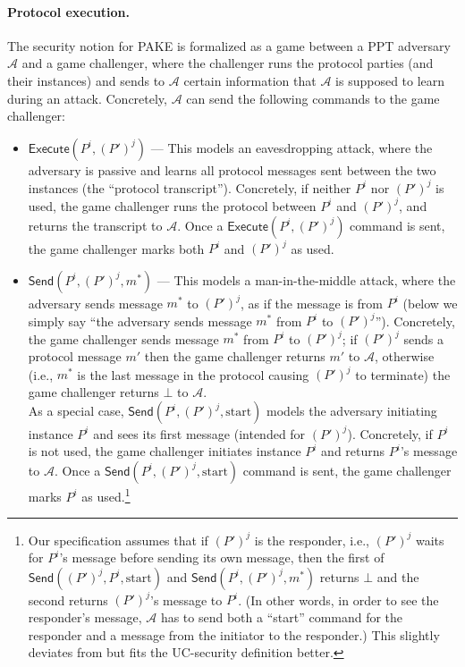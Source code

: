 \documentclass{article}
\newcommand{\adv}{\mathcal{A}}
\newcommand{\Execute}{\mathsf{Execute}}
\newcommand{\Send}{\mathsf{Send}}
\begin{document}
\paragraph{Protocol execution.}
The security notion for PAKE is formalized as a game between a PPT adversary $\adv$ and a game challenger, where the challenger runs the protocol parties (and their instances) and sends to $\adv$ certain information that $\adv$ is supposed to learn during an attack. Concretely, $\adv$ can send the following commands to the game challenger:
\begin{itemize}
  \item $\Execute(P^i, (P')^j)$ --- This models an eavesdropping attack, where the adversary is passive and learns all protocol messages sent between the two instances (the ``protocol transcript''). Concretely, if neither $P^i$ nor $(P')^j$ is used, the game challenger runs the protocol between $P^i$ and $(P')^j$, and returns the transcript to $\adv$. Once a $\Execute(P^i, (P')^j)$ command is sent, the game challenger marks both $P^i$ and $(P')^j$ as used.
  \item $\Send(P^i, (P')^j, m^*)$ --- This models a man-in-the-middle attack, where the adversary sends message $m^*$ to $(P')^j$, as if the message is from $P^i$ (below we simply say ``the adversary sends message $m^*$ from $P^i$ to $(P')^j$''). Concretely, the game challenger sends message $m^*$ from $P^i$ to $(P')^j$; if $(P')^j$ sends a protocol message $m'$ then the game challenger returns $m'$ to $\adv$, otherwise (i.e., $m^*$ is the last message in the protocol causing $(P')^j$ to terminate) the game challenger returns $\bot$ to $\adv$. \\
      As a special case, $\Send(P^i, (P')^j, \text{start})$ models the adversary initiating instance $P^i$ and sees its first message (intended for $(P')^j$). Concretely, if $P^i$ is not used, the game challenger initiates instance $P^i$ and returns $P^i$'s message to $\adv$. Once a $\Send(P^i, (P')^j, \text{start})$ command is sent, the game challenger marks $P^i$ as used.\footnote{Our specification assumes that if $(P')^j$ is the responder, i.e., $(P')^j$ waits for $P^i$'s message before sending its own message, then the first of $\Send((P')^j, P^i, \text{start})$ and $\Send(P^i, (P')^j, m^*)$ returns $\bot$ and the second returns $(P')^j$'s message to $P^i$. (In other words, in order to see the responder's message, $\adv$ has to send both a ``start'' command for the responder and a message from the initiator to the responder.) This slightly deviates from \cite{EC:BelPoiRog00,JACM:KatOstYun09} but fits the UC-security definition better.}
\end{itemize}
\end{document}
